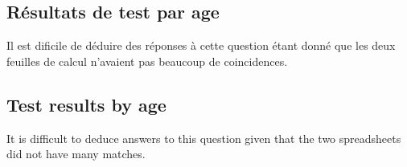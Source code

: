 \documentclass[11pt]{article}
\begin{document}
\begin{multicols}{2} 





\subsection*{Résultats de test par age}
Il est dificile de déduire des réponses à cette question étant donné que les deux feuilles de calcul n'avaient pas beaucoup de coincidences.

\vfill
\columnbreak

\subsection*{Test results by age}
It is difficult to deduce answers to this question given that the two spreadsheets did not have many matches.  

\end{multicols}
\end{document}
